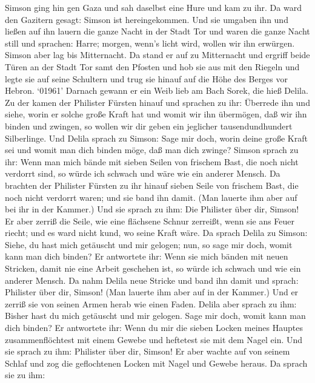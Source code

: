  Simson ging hin gen Gaza und sah daselbst eine Hure und kam
zu ihr.  Da ward den Gazitern gesagt: Simson ist
hereingekommen. Und sie umgaben ihn und ließen auf ihn lauern die ganze
Nacht in der Stadt Tor und waren die ganze Nacht still und sprachen:
Harre; morgen, wenn's licht wird, wollen wir ihn erwürgen. 
Simson aber lag bis Mitternacht. Da stand er auf zu Mitternacht und
ergriff beide Türen an der Stadt Tor samt den Pfosten und hob sie aus
mit den Riegeln und legte sie auf seine Schultern und trug sie hinauf
auf die Höhe des Berges vor Hebron.  `01961' Darnach gewann
er ein Weib lieb am Bach Sorek, die hieß Delila.  Zu der
kamen der Philister Fürsten hinauf und sprachen zu ihr: Überrede ihn und
siehe, worin er solche große Kraft hat und womit wir ihn übermögen, daß
wir ihn binden und zwingen, so wollen wir dir geben ein jeglicher
tausendundhundert Silberlinge.  Und Delila sprach zu Simson:
Sage mir doch, worin deine große Kraft sei und womit man dich binden
möge, daß man dich zwinge?  Simson sprach zu ihr: Wenn man
mich bände mit sieben Seilen von frischem Bast, die noch nicht verdorrt
sind, so würde ich schwach und wäre wie ein anderer Mensch. 
Da brachten der Philister Fürsten zu ihr hinauf sieben Seile von
frischem Bast, die noch nicht verdorrt waren; und sie band ihn damit.
 (Man lauerte ihm aber auf bei ihr in der Kammer.) Und sie
sprach zu ihm: Die Philister über dir, Simson! Er aber zerriß die Seile,
wie eine flächsene Schnur zerreißt, wenn sie ans Feuer riecht; und es
ward nicht kund, wo seine Kraft wäre.  Da sprach Delila zu
Simson: Siehe, du hast mich getäuscht und mir gelogen; nun, so sage mir
doch, womit kann man dich binden?  Er antwortete ihr: Wenn
sie mich bänden mit neuen Stricken, damit nie eine Arbeit geschehen ist,
so würde ich schwach und wie ein anderer Mensch.  Da nahm
Delila neue Stricke und band ihn damit und sprach: Philister über dir,
Simson! (Man lauerte ihm aber auf in der Kammer.) Und er zerriß sie von
seinen Armen herab wie einen Faden.  Delila aber sprach zu
ihm: Bisher hast du mich getäuscht und mir gelogen. Sage mir doch, womit
kann man dich binden? Er antwortete ihr: Wenn du mir die sieben Locken
meines Hauptes zusammenflöchtest mit einem Gewebe und heftetest sie mit
dem Nagel ein.  Und sie sprach zu ihm: Philister über dir,
Simson! Er aber wachte auf von seinem Schlaf und zog die geflochtenen
Locken mit Nagel und Gewebe heraus.  Da sprach sie zu ihm:
